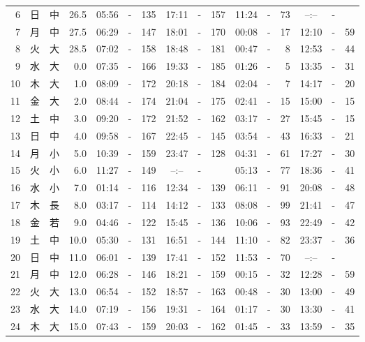 \documentclass[12pt.a4j]{jsarticle}
\begin{document}
\begin{center}
\begin{table}[ht]
\begin{tabular}{|rc|cr|ccrccr|ccrccr|}
 6 & 日 & 中 & 26.5 &  05:56 &-& 135  &  17:11 &-& 157  &   11:24 &-&  73  &   --:-- &-&     \\
 7 & 月 & 中 & 27.5 &  06:29 &-& 147  &  18:01 &-& 170  &   00:08 &-&  17  &   12:10 &-&  59  \\
 8 & 火 & 大 & 28.5 &  07:02 &-& 158  &  18:48 &-& 181  &   00:47 &-&   8  &   12:53 &-&  44  \\
 9 & 水 & 大 &  0.0 &  07:35 &-& 166  &  19:33 &-& 185  &   01:26 &-&   5  &   13:35 &-&  31  \\
10 & 木 & 大 &  1.0 &  08:09 &-& 172  &  20:18 &-& 184  &   02:04 &-&   7  &   14:17 &-&  20  \\
11 & 金 & 大 &  2.0 &  08:44 &-& 174  &  21:04 &-& 175  &   02:41 &-&  15  &   15:00 &-&  15  \\
12 & 土 & 中 &  3.0 &  09:20 &-& 172  &  21:52 &-& 162  &   03:17 &-&  27  &   15:45 &-&  15  \\
13 & 日 & 中 &  4.0 &  09:58 &-& 167  &  22:45 &-& 145  &   03:54 &-&  43  &   16:33 &-&  21  \\
14 & 月 & 小 &  5.0 &  10:39 &-& 159  &  23:47 &-& 128  &   04:31 &-&  61  &   17:27 &-&  30  \\
15 & 火 & 小 &  6.0 &  11:27 &-& 149  &  --:-- &-&     &   05:13 &-&  77  &   18:36 &-&  41  \\
16 & 水 & 小 &  7.0 &  01:14 &-& 116  &  12:34 &-& 139  &   06:11 &-&  91  &   20:08 &-&  48  \\
17 & 木 & 長 &  8.0 &  03:17 &-& 114  &  14:12 &-& 133  &   08:08 &-&  99  &   21:41 &-&  47  \\
18 & 金 & 若 &  9.0 &  04:46 &-& 122  &  15:45 &-& 136  &   10:06 &-&  93  &   22:49 &-&  42  \\
19 & 土 & 中 & 10.0 &  05:30 &-& 131  &  16:51 &-& 144  &   11:10 &-&  82  &   23:37 &-&  36  \\
20 & 日 & 中 & 11.0 &  06:01 &-& 139  &  17:41 &-& 152  &   11:53 &-&  70  &   --:-- &-&     \\
21 & 月 & 中 & 12.0 &  06:28 &-& 146  &  18:21 &-& 159  &   00:15 &-&  32  &   12:28 &-&  59  \\
22 & 火 & 大 & 13.0 &  06:54 &-& 152  &  18:57 &-& 163  &   00:48 &-&  30  &   13:00 &-&  49  \\
23 & 水 & 大 & 14.0 &  07:19 &-& 156  &  19:31 &-& 164  &   01:17 &-&  30  &   13:30 &-&  41  \\
24 & 木 & 大 & 15.0 &  07:43 &-& 159  &  20:03 &-& 162  &   01:45 &-&  33  &   13:59 &-&  35  \\

\end{tabular}
\end{table}
\end{center}
\end{document}
